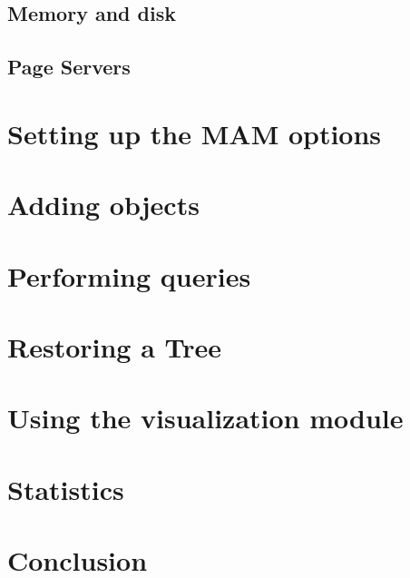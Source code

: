 \subsection{Memory and disk}

\subsection{Page Servers}

\section{Setting up the MAM options}

\section{Adding objects}

\section{Performing queries}

\section{Restoring a Tree}

\section{Using the visualization module}

\section{Statistics}

\section{Conclusion}

